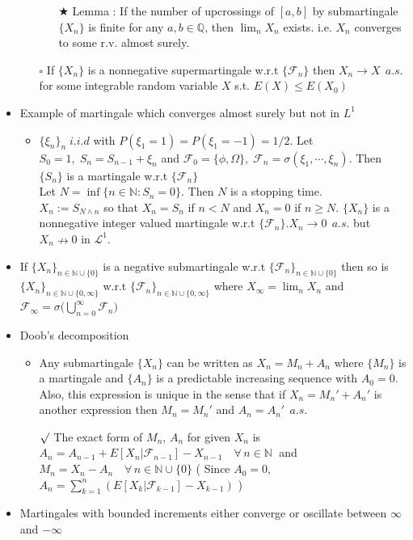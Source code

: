 \documentclass[12pt, A4]{article}
\newcommand{\sq}{$\square$}
\newcommand{\rmk}{$\surd$}
\newcommand{\trick}{$\bigstar$}
\newcommand{\N}{\mathbb{N}}
\newcommand{\Q}{\mathbb{Q}}
\newcommand{\F}{\mathcal{F}}
\newcommand{\LL}{\mathcal{L}}
\newcommand{\foranyn}{\quad \forall \, n\in \N}
\begin{document}
\begin{itemize}
\begin{itemize}
\begin{itemize}
			\item[\trick] Lemma : If the number of upcrossings of $[a,b]$ by submartingale $\{X_n\}$ is finite for any $a,b\in \Q$, then $\lim_n X_n$ exists.\; i.e. $X_n$ converges to some r.v. almost surely.
		\end{itemize}
		\item[\sq] If $\{X_n\}$ is a nonnegative supermartingale w.r.t $\{\F_n\}$ then $X_n\rightarrow X\;\, a.s.$ for some integrable random variable $X$ s.t. $E(X)\leq E(X_0)$
	\end{itemize} 
	\item Example of martingale which converges almost surely but not in $L^1$
	\begin{itemize}
		\item $\{\xi_n\}_n\;i.i.d$ with $P(\xi_1=1)=P(\xi_1=-1)=1/2$. Let $S_0=1,\; S_n=S_{n-1}+\xi_n$ and $\F_0=\{\phi, \Omega\}, \; \F_n=\sigma(\xi_1, \cdots, \xi_n)$. Then $\{S_n\}$ is a martingale w.r.t $\{\F_n\}$ \\ Let $N=\inf\{n\in \N : S_n=0\}$. Then $N$ is a stopping time. \\ $X_n:=S_{N\wedge n}$ so that $X_n=S_n$ if $n<N$ and $X_n=0$ if $n\geq N$. $\{X_n\}$ is a nonnegative integer valued martingale w.r.t $\{\F_n\}$.\quad $X_n\rightarrow 0\;\, a.s.$ but $X_n \nrightarrow 0$ in $\LL^1$.
	\end{itemize}
	\item If $\{X_n\}_{n\in \N\cup\{0\}}$ is a negative submartingale w.r.t $\{\F_n\}_{n\in \N\cup\{0\}}$ then so is $\{X_n\}_{n\in \N\cup\{0,\infty\}}$ w.r.t $\{\F_n\}_{n\in \N\cup\{0,\infty\}}$ where $X_\infty=\lim_n X_n$ and $\F_\infty= \sigma\big(\bigcup_{n=0}^\infty \F_n \big)$
	\item Doob's decomposition
	\begin{itemize}
		\item Any submartingale $\{X_n\}$ can be written as $X_n=M_n+A_n$ where $\{M_n\}$ is a martingale and $\{A_n\}$ is a predictable increasing sequence with $A_0=0$. Also, this expression is unique in the sense that if $X_n=M_n'+A_n'$ is another expression then $M_n=M_n'$ and $A_n=A_n'\;\,a.s.$
		\item[\rmk] The exact form of $M_n,\, A_n$ for given $X_n$ is $A_n=A_{n-1}+E[X_n|\F_{n-1}]-X_{n-1}\foranyn\;$ and $M_n=X_n-A_n \foranyn\cup\{0\}$ ( Since $A_0=0$, $A_n=\sum_{k=1}^n (E[X_k|\F_{k-1}]-X_{k-1})$ )
	\end{itemize}
	\item Martingales with bounded increments either converge or oscillate between $\infty$ and $-\infty$

\end{itemize}
\end{document}
